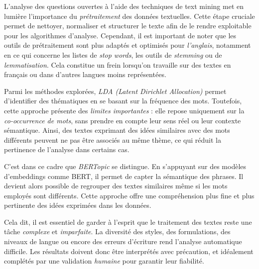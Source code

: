 \documentclass[
]{article}
\begin{document}
L'analyse des questions ouvertes à l'aide des techniques de text mining
met en lumière l'importance du \emph{prétraitement} des données
textuelles. Cette étape cruciale permet de nettoyer, normaliser et
structurer le texte afin de le rendre exploitable pour les algorithmes
d'analyse. Cependant, il est important de noter que les outils de
prétraitement sont plus adaptés et optimisés pour \emph{l'anglais},
notamment en ce qui concerne les listes de \emph{stop words}, les outils
de \emph{stemming} ou de \emph{lemmatisation}. Cela constitue un frein
lorsqu'on travaille sur des textes en français ou dans d'autres langues
moins représentées.

Parmi les méthodes explorées, \emph{LDA (Latent Dirichlet Allocation)}
permet d'identifier des thématiques en se basant sur la fréquence des
mots. Toutefois, cette approche présente des \emph{limites importantes}
: elle repose uniquement sur la \emph{co-occurrence de mots}, sans
prendre en compte leur sens réel ou leur contexte sémantique. Ainsi, des
textes exprimant des idées similaires avec des mots différents peuvent
ne pas être associés au même thème, ce qui réduit la pertinence de
l'analyse dans certains cas.

C'est dans ce cadre que \emph{BERTopic} se distingue. En s'appuyant sur
des modèles d'embeddings comme BERT, il permet de capter la sémantique
des phrases. Il devient alors possible de regrouper des textes
similaires même si les mots employés sont différents. Cette approche
offre une compréhension plus fine et plus pertinente des idées exprimées
dans les données.

Cela dit, il est essentiel de garder à l'esprit que le traitement des
textes reste une tâche \emph{complexe} et \emph{imparfaite}. La
diversité des styles, des formulations, des niveaux de langue ou encore
des erreurs d'écriture rend l'analyse automatique difficile. Les
résultats doivent donc être interprétés avec précaution, et idéalement
complétés par une validation \emph{humaine} pour garantir leur
fiabilité.
\end{document}
